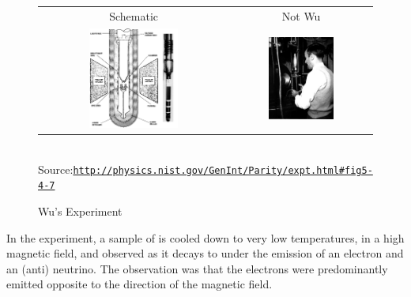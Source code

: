 \begin{figure}
\caption{Wu's Experiment}
\begin{tabular}{cc}
 Schematic & Not Wu \\
\parbox{0.49\textwidth}{
\includegraphics[width=0.49\textwidth]{fig/C_P_CP/wus_parity_apperatus.png}
}
&
\parbox{0.49\textwidth}{
\includegraphics[width=0.49\textwidth]{fig/C_P_CP/wus_parity_photo.jpg}
}
\end{tabular}
\\Source:\href{http://physics.nist.gov/GenInt/Parity/expt.html#fig5-4-7}{\texttt{http://physics.nist.gov/GenInt/Parity/expt.html\#fig5-4-7}}
\end{figure}
 In the experiment, a sample of  is cooled down to
 very low temperatures, in a high magnetic field, and observed as it
 decays to  under the emission of an electron and
 an (anti) neutrino. The observation was that the electrons were
 predominantly emitted opposite to the direction of the magnetic
 field. 
